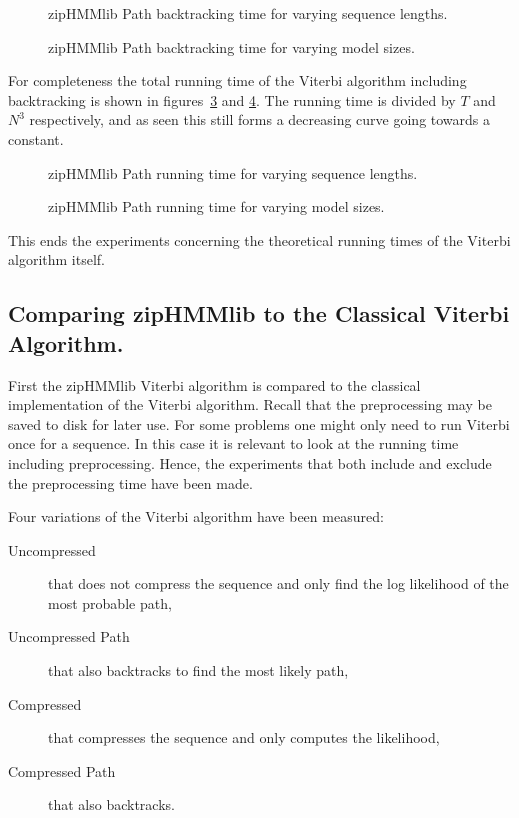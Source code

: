 \begin{figure}
  \centering
  
  \caption{zipHMMlib Path backtracking time for varying sequence lengths.}
  \label{fig:assymptotic_viterbi_backtrack_n}
\end{figure}

\begin{figure}
  \centering
  
  \caption{zipHMMlib Path backtracking time for varying model sizes.}
  \label{fig:assymptotic_viterbi_backtrack_k}
\end{figure}

For completeness the total running time of the Viterbi algorithm including
backtracking is shown in figures~\ref{fig:assymptotic_viterbi_path_n} and
\ref{fig:assymptotic_viterbi_path_k}. The running time is divided by $T$ and
$N^3$ respectively, and as seen this still forms a decreasing curve going
towards a constant.

\begin{figure}
  \centering
  
  \caption{zipHMMlib Path running time for varying sequence lengths.}
  \label{fig:assymptotic_viterbi_path_n}
\end{figure}

\begin{figure}
  \centering
  
  \caption{zipHMMlib Path running time for varying model sizes.}
  \label{fig:assymptotic_viterbi_path_k}
\end{figure}

This ends the experiments concerning the theoretical running times of the
Viterbi algorithm itself.

\subsection{Comparing zipHMMlib to the Classical Viterbi Algorithm.}

First the zipHMMlib Viterbi algorithm is compared to the classical
implementation of the Viterbi algorithm. Recall that the preprocessing may be
saved to disk for later use. For some problems one might only need to run
Viterbi once for a sequence. In this case it is relevant to look at the running time
including preprocessing. Hence, the experiments that both include and exclude
the preprocessing time have been made.

Four variations of the Viterbi algorithm have been measured:
\begin{description}
\item[Uncompressed] that does not compress the sequence and only find the log
  likelihood of the most probable path,
\item[Uncompressed Path] that also backtracks to find the most likely path,
\item[Compressed] that compresses the sequence and only computes the
  likelihood,
\item[Compressed Path] that also backtracks.
\end{description}

